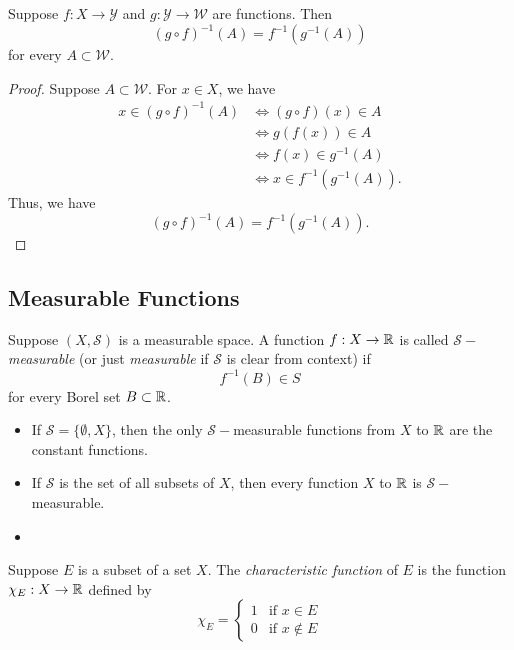 \documentclass[11pt,a4paper]{book}
\begin{document}
\begin{prop}
    Suppose \( f: X \to \mathcal{Y} \) and \( g: \mathcal{Y} \to \mathcal{W} \) are functions. Then
    \[ (g \circ f)^{-1}(A) = f^{-1}(g^{-1}(A))   \]
    for every \( A \subset \mathcal{W} \).
\end{prop}
\begin{proof}
Suppose \( A \subset \mathcal{W} \). For \( x \in X  \), we have
\begin{align*}
    x \in (g \circ f)^{-1}(A) &\iff (g \circ f)(x) \in A  \\
                              &\iff g(f(x)) \in A \\
                              &\iff f(x) \in g^{-1}(A) \\
                              &\iff  x \in f^{-1}(g^{-1}(A)). 
\end{align*}
Thus, we have 
\[ (g \circ f)^{-1}(A) = f^{-1}(g^{-1}(A)).  \]
\end{proof}

\subsection{Measurable Functions}

\begin{definition}
Suppose \( (X,\mathcal{S}) \) is a measurable space. A function \( f: X \to \mathbb{R}  \) is called \textit{\( \mathcal{S} -  \)measurable } (or just \textit{measurable} if \( \mathcal{S} \) is clear from context) if  
\[  f^{-1}(B) \in S \]
for every Borel set \( B \subset \mathbb{R} \).
\end{definition}

\begin{eg}
   \begin{itemize}
       \item If \( \mathcal{S} = \{ \emptyset, X  \}  \), then the only \( \mathcal{S}- \)measurable functions from \( X  \) to \( \mathbb{R}  \) are the constant functions.
       \item If \( \mathcal{S} \) is the set of all subsets of \( X  \), then every function \( X  \) to \( \mathbb{R}  \) is \( \mathcal{S}- \)measurable.
        \item 
   \end{itemize} 
\end{eg}

\begin{definition}
   Suppose \( E  \) is a subset of a set \( X  \). The \textit{characteristic function} of \( E  \) is the function \( {\chi}_{E}: X \to \mathbb{R}  \) defined by 
   \[  {\chi}_{E} = 
   \begin{cases}
       1 &\text{if } x \in E  \\
       0 &\text{if } x \notin E 
   \end{cases} \]
\end{definition}
\end{document}
